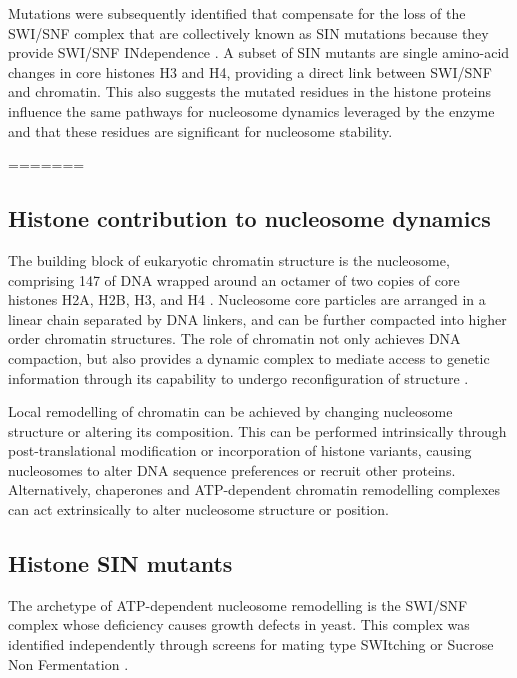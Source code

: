     Mutations were subsequently identified that compensate for the loss of the SWI/SNF complex
    that are collectively known as SIN mutations because they provide SWI/SNF INdependence .
    A subset of SIN mutants are single amino-acid changes in core histones H3 and H4,
    providing a direct link between SWI/SNF and chromatin.
    This also suggests the mutated residues in the histone proteins 
    influence the same pathways for nucleosome dynamics leveraged by the enzyme 
    and that these residues are significant for nucleosome stability.

=======
  \subsection{Histone contribution to nucleosome dynamics}

    The building block of eukaryotic chromatin structure is the nucleosome, comprising
    \SI{147}{\bp} of DNA wrapped around an octamer of two copies of core histones H2A,
    H2B, H3, and H4 \citep{luger1997crystal}.
    Nucleosome core particles are arranged in a linear chain separated by DNA linkers, and
    can be further compacted into higher order chromatin structures.
    The role of chromatin not only achieves DNA compaction,
    but also provides a dynamic complex to mediate access to genetic
    information through its capability to undergo reconfiguration of
    structure \citep{flaus2017unlocking}.

    Local remodelling of chromatin can be achieved
    by changing nucleosome structure or altering its composition.
    This can be performed intrinsically through post-translational modification
    or incorporation of histone variants,
    causing nucleosomes to alter DNA sequence preferences or recruit other proteins.
    Alternatively, chaperones and ATP-dependent chromatin remodelling complexes
    can act extrinsically to alter nucleosome structure or position.

  \subsection{Histone SIN mutants}

    The archetype of ATP-dependent nucleosome remodelling is the SWI/SNF complex
    whose deficiency causes growth defects in yeast.
    This complex was identified independently through screens for
    mating type SWItching \citep{SWI-mutants}
    or Sucrose Non Fermentation \citep{SNF-mutants-original-discovery, SNF-mutants2}.

